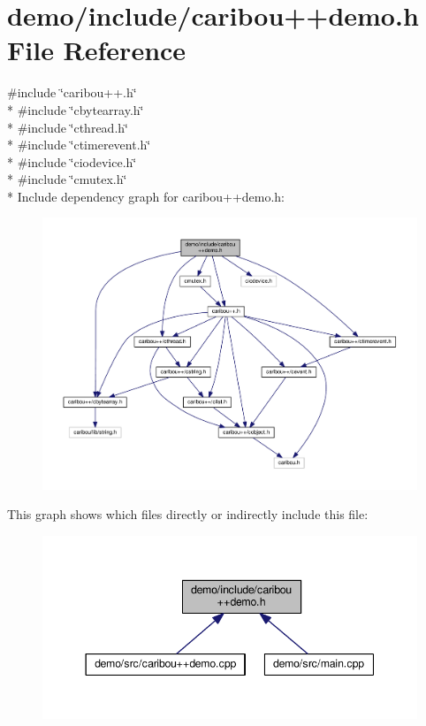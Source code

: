 \section{demo/include/caribou++demo.h File Reference}
\label{caribou_09_09demo_8h}
{\ttfamily \#include \char`\"{}caribou++.\-h\char`\"{}}\\*
{\ttfamily \#include \char`\"{}cbytearray.\-h\char`\"{}}\\*
{\ttfamily \#include \char`\"{}cthread.\-h\char`\"{}}\\*
{\ttfamily \#include \char`\"{}ctimerevent.\-h\char`\"{}}\\*
{\ttfamily \#include \char`\"{}ciodevice.\-h\char`\"{}}\\*
{\ttfamily \#include \char`\"{}cmutex.\-h\char`\"{}}\\*
Include dependency graph for caribou++demo.h\-:\nopagebreak
\begin{figure}[H]
\begin{center}
\leavevmode
\includegraphics[width=350pt]{caribou_09_09demo_8h__incl}
\end{center}
\end{figure}
This graph shows which files directly or indirectly include this file\-:\nopagebreak
\begin{figure}[H]
\begin{center}
\leavevmode
\includegraphics[width=344pt]{caribou_09_09demo_8h__dep__incl}
\end{center}
\end{figure}

